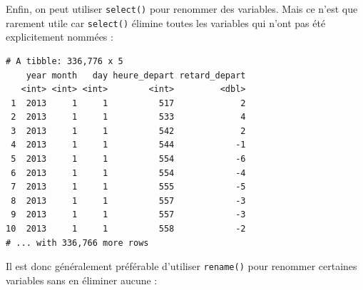 \documentclass[a4paperpaper,]{article}
\newenvironment{Shaded}{\begin{snugshade}}{\end{snugshade}}
\newcommand{\DataTypeTok}[1]{\textcolor[rgb]{0.00,0.34,0.68}{#1}}
\newcommand{\KeywordTok}[1]{\textcolor[rgb]{0.12,0.11,0.11}{\textbf{#1}}}
\newcommand{\NormalTok}[1]{\textcolor[rgb]{0.12,0.11,0.11}{#1}}
\newcommand{\OperatorTok}[1]{\textcolor[rgb]{0.12,0.11,0.11}{#1}}
\newcommand{\StringTok}[1]{\textcolor[rgb]{0.75,0.01,0.01}{#1}}
\begin{document}
\begin{Shaded}
\end{Shaded}

Enfin, on peut utiliser \texttt{select()} pour renommer des variables. Mais ce n'est que rarement utile car \texttt{select()} élimine toutes les variables qui n'ont pas été explicitement nommées :

\begin{Shaded}
\end{Shaded}

\begin{verbatim}
# A tibble: 336,776 x 5
    year month   day heure_depart retard_depart
   <int> <int> <int>        <int>         <dbl>
 1  2013     1     1          517             2
 2  2013     1     1          533             4
 3  2013     1     1          542             2
 4  2013     1     1          544            -1
 5  2013     1     1          554            -6
 6  2013     1     1          554            -4
 7  2013     1     1          555            -5
 8  2013     1     1          557            -3
 9  2013     1     1          557            -3
10  2013     1     1          558            -2
# ... with 336,766 more rows
\end{verbatim}

Il est donc généralement préférable d'utiliser \texttt{rename()} pour renommer certaines variables sans en éliminer aucune :

\begin{Shaded}
\end{Shaded}
\end{document}
